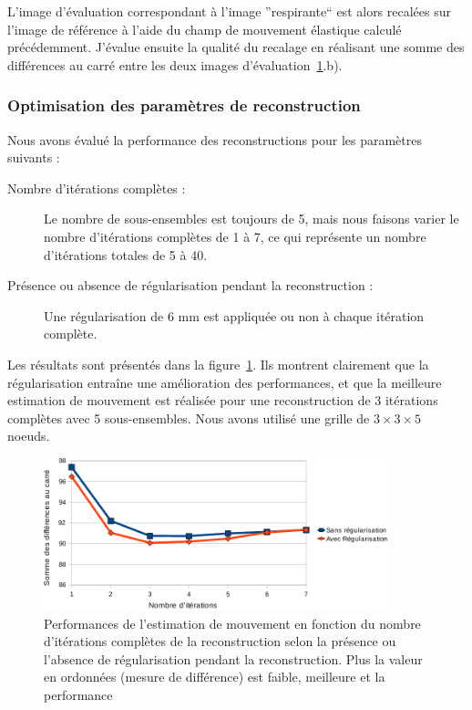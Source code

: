 L'image d'évaluation correspondant à l'image ''respirante`` est alors recalées sur l'image de référence à l'aide du champ de mouvement élastique calculé précédemment. J'évalue ensuite la qualité du recalage en réalisant une somme des différences au carré entre les deux images d'évaluation~\ref{lab:perfsFctIterReg}.b).


\subsubsection{Optimisation des paramètres de reconstruction}

Nous avons évalué la performance des reconstructions pour les paramètres suivants :
\begin{description}
 \item[Nombre d'itérations complètes :] Le nombre de sous-ensembles est toujours de 5, mais nous faisons varier le nombre d'itérations complètes de 1 à 7, ce qui représente un nombre d'itérations totales de 5 à 40.
 \item[Présence ou absence de régularisation pendant la reconstruction :] Une régularisation de 6 mm  est appliquée ou non à chaque itération complète.
\end{description}

Les résultats sont présentés dans la figure~\ref{lab:perfsFctIterReg}. Ils montrent clairement que la régularisation entraîne une amélioration des performances, et que la meilleure estimation de mouvement est réalisée pour une reconstruction de 3 itérations complètes avec 5 sous-ensembles. Nous avons utilisé une grille de $3 \times 3 \times 5$ noeuds.

\begin{figure}
\centering
\includegraphics[width=10cm]{images/perfsRecalageFctIter_crop}
\caption[Performances de l'estimation de mouvement en fonction de la régularisation]{Performances de l'estimation de mouvement en fonction du nombre d'itérations complètes de la reconstruction selon la présence ou l'absence de régularisation pendant la reconstruction. Plus la valeur en ordonnées (mesure de différence) est faible, meilleure et la performance}
\label{lab:perfsFctIterReg}
\end{figure}

